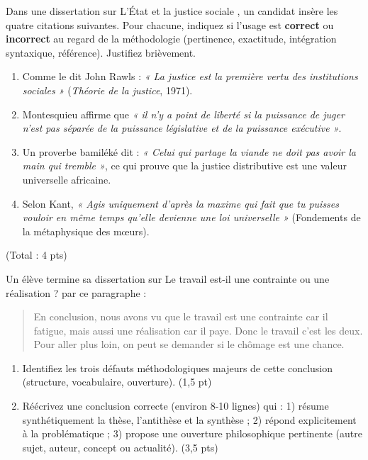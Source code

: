 \documentclass[11pt]{article}
\begin{document}
\begin{exercice}
Dans une dissertation sur \og L'État et la justice sociale \fg{}, un candidat insère les quatre citations suivantes. Pour chacune, indiquez si l'usage est \textbf{correct} ou \textbf{incorrect} au regard de la méthodologie (pertinence, exactitude, intégration syntaxique, référence). Justifiez brièvement.
\begin{enumerate}
    \item \og Comme le dit John Rawls : \textit{« La justice est la première vertu des institutions sociales »} (\textit{Théorie de la justice}, 1971). \fg{}
    \item \og Montesquieu affirme que \textit{« il n'y a point de liberté si la puissance de juger n'est pas séparée de la puissance législative et de la puissance exécutive »}. \fg{}
    \item \og Un proverbe bamiléké dit : \textit{« Celui qui partage la viande ne doit pas avoir la main qui tremble »}, ce qui prouve que la justice distributive est une valeur universelle africaine. \fg{}
    \item \og Selon Kant, \textit{« Agis uniquement d'après la maxime qui fait que tu puisses vouloir en même temps qu'elle devienne une loi universelle »} (Fondements de la métaphysique des mœurs). \fg{}
\end{enumerate}
(Total : 4 pts)
\end{exercice}

\begin{exercice}
Un élève termine sa dissertation sur \og Le travail est-il une contrainte ou une réalisation ? \fg{} par ce paragraphe :
\begin{quote}
\og En conclusion, nous avons vu que le travail est une contrainte car il fatigue, mais aussi une réalisation car il paye. Donc le travail c'est les deux. Pour aller plus loin, on peut se demander si le chômage est une chance. \fg{}
\end{quote}
\begin{enumerate}
    \item Identifiez les trois défauts méthodologiques majeurs de cette conclusion (structure, vocabulaire, ouverture). (1,5 pt)
    \item Réécrivez une conclusion correcte (environ 8-10 lignes) qui : 1) résume synthétiquement la thèse, l'antithèse et la synthèse ; 2) répond explicitement à la problématique ; 3) propose une ouverture philosophique pertinente (autre sujet, auteur, concept ou actualité). (3,5 pts)
\end{enumerate}
\end{exercice}
\end{document}
